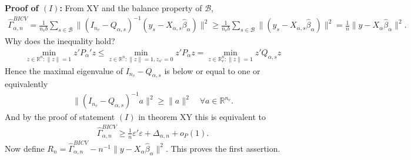 \documentclass[Research_Module_ES.tex]{subfiles}
\begin{document}
\textbf{Proof of $(I)$:} From XY and the balance property of $\mathcal{B}$,
\begin{align*}
\hat{\Gamma}_{\alpha,n}^{BICV} = \frac{1}{n_vb}\sum_{s\in \mathcal{B}}\lVert (I_{n_v}-Q_{\alpha,s})^{-1}(y_s-X_{\alpha,s}\hat{\beta}_\alpha)\rVert^2 \ge \frac{1}{n_vb}\sum_{s\in \mathcal{B}}\lVert (y_s-X_{\alpha,s}\hat{\beta}_\alpha)\rVert^2 = \frac{1}{n}\lVert y-X_{\alpha}\hat{\beta}_\alpha\rVert^2.
\end{align*}
Why does the inequality hold?
\begin{align*}
\min_{z\in \mathbb{R}^n : \lVert z\rVert=1}z'P_\alpha'z 
\le \min_{z\in \mathbb{R}^n : \lVert z\rVert=1, z_{s^c}=0}z'P_\alpha z
= \min_{z\in \mathbb{R}^n_v : \lVert z\rVert=1}z'Q_{\alpha,s}z
\end{align*}
Hence the maximal eigenvalue of $I_{n_v}-Q_{\alpha,s}$ is below or equal to one or equivalently 
\begin{align*}
\lVert (I_{n_v}-Q_{\alpha,s})^{-1}a\rVert ^2 \ge \lVert a\rVert ^2 \quad \forall a\in \mathbb{R}^{n_v}.
\end{align*}
And by the proof of statement $(I)$ in theorem XY this is equivalent to
\begin{align*}
\hat{\Gamma}_{\alpha,n}^{BICV} \ge \frac{1}{n}\varepsilon'\varepsilon + \Delta_{\alpha,n} + o_P(1).
\end{align*}
Now define $R_n = \hat{\Gamma}_{\alpha,n}^{BICV} - n^{-1}\lVert y-X_{\alpha}\hat{\beta}_\alpha\rVert^2$. This proves the first assertion.
\\
\end{document}
